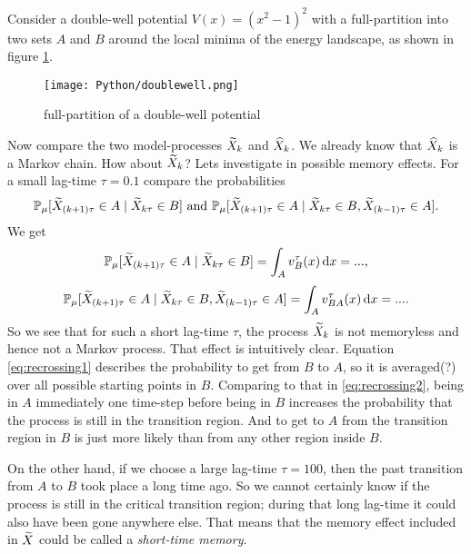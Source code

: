 Consider a double-well potential $V(x) = (x^2-1)^2$ with a full-partition into two sets $A$ and $B$ around the local minima of the energy landscape, as shown in figure \ref{fig:doublewell}.
\begin{figure}[!ht]
	\centering
	\texttt{[image: Python/doublewell.png]} %
	\caption{full-partition of a double-well potential}
	\label{fig:doublewell}
\end{figure}
Now compare the two model-processes $\widetilde{X}_k$ and  $\widehat{X}_k$.
We already know that $\widehat{X}_k$ is a Markov chain. How about  $\widetilde{X}_k$?
Lets investigate in possible memory effects.
For a small lag-time $\tau = 0.1$ compare the probabilities 
\begin{equation*}
\mathbb{P}_\mu[\widetilde{X}_{(k+1)\tau} \in A \mid \widetilde{X}_{k\tau} \in B] \textrm{ and }
\mathbb{P}_\mu[\widetilde{X}_{(k+1)\tau} \in A \mid \widetilde{X}_{k\tau} \in B, \widetilde{X}_{(k-1)\tau} \in A].
\end{equation*}
We get 
\begin{equation}
\label{eq:recrossing1}
\mathbb{P}_\mu[\widetilde{X}_{(k+1)\tau} \in A \mid \widetilde{X}_{k\tau} \in B] = \int_A v_B^\tau(x) \mathop{}\!\mathrm{d} x = ... ,
\end{equation}
\begin{equation}
\label{eq:recrossing2}
\mathbb{P}_\mu[\widetilde{X}_{(k+1)\tau} \in A \mid \widetilde{X}_{k\tau} \in B, \widetilde{X}_{(k-1)\tau} \in A] = \int_A v_{BA}^\tau(x) \mathop{}\!\mathrm{d} x = ... .
\end{equation}
So we see that for such a short lag-time $\tau$, the process $\widetilde{X}_k$ is not memoryless and hence not a Markov process.
That effect is intuitively clear. Equation \eqref{eq:recrossing1} describes the probability to get from $B$ to $A$, so it is averaged(?) over all possible starting points in $B$. Comparing to that in \eqref{eq:recrossing2}, being in $A$ immediately one time-step before being in $B$ increases the probability that the process is still in the transition region. And to get to $A$ from the transition region in $B$ is just more likely than from any other region inside $B$.

On the other hand, if we choose a large lag-time $\tau = 100$, then the past transition from $A$ to $B$ took place a long time ago. So we cannot certainly know if the process is still in the critical transition region; during that long lag-time it could also have been gone anywhere else.
That means that the memory effect included in $\widetilde{X}$ could be called a \textit{short-time memory}.

